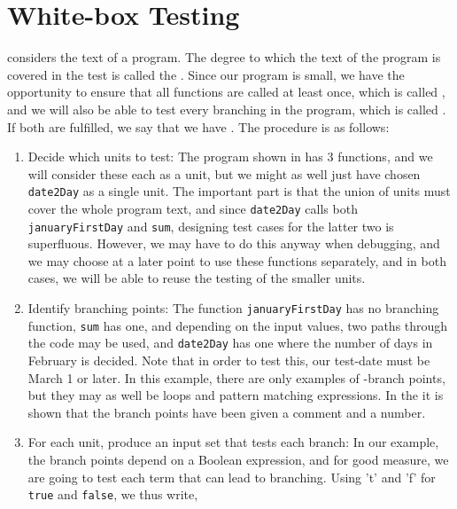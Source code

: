 \documentclass[fsharpnotes.tex]{subfiles}
\begin{document}
\section{White-box Testing}
 considers the text of a program. The degree to which the text of the program is covered in the test is called the . Since our program is small, we have the opportunity to ensure that all functions are called at least once, which is called , and we will also be able to test every branching in the program, which is called . If both are fulfilled, we say that we have . The procedure is as follows:
\begin{enumerate}
\item Decide which units to test: The program shown in  has 3 functions, and we will consider these each as a unit, but we might as well just have chosen \lstinline!date2Day! as a single unit. The important part is that the union of units must cover the whole program text, and since \lstinline!date2Day! calls both \lstinline!januaryFirstDay! and \lstinline!sum!, designing test cases for the latter two is superfluous. However, we may have to do this anyway when debugging, and we may choose at a later point to use these functions separately, and in both cases, we will be able to reuse the testing of the smaller units.
\item Identify branching points: The function \lstinline!januaryFirstDay! has no branching function, \lstinline!sum! has one, and depending on the input values, two paths through the code may be used, and \lstinline!date2Day! has one where the number of days in February is decided. Note that in order to test this, our test-date must be March 1 or later. In this example, there are only examples of -branch points, but they may as well be loops and pattern matching expressions. In the  it is shown that the branch points have been given a comment and a number.
 \item For each unit, produce an input set that tests each branch: In our example, the branch points depend on a Boolean expression, and for good measure, we are going to test each term that can lead to branching. Using 't' and 'f' for \lstinline{true} and \lstinline{false}, we thus write,
   \begin{center}

\end{center}
\end{enumerate}
\end{document}

